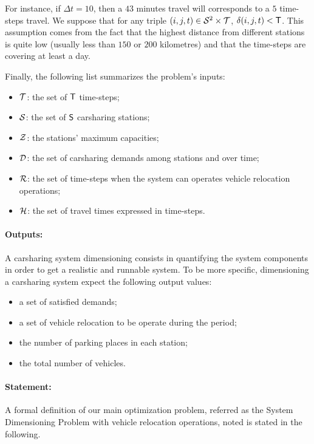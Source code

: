 \begin{bibunit}[ieeetr]
For instance, if $\Delta t = 10$, then a $43$ minutes travel will corresponds to a $5$ time-steps travel.
We suppose that for any triple $(i,j,t) \in \mathcal{S}^2 \times \mathcal{T}$, $\delta(i,j,t) < \mathsf{T}$.
This assumption comes from the fact that the highest distance from different stations is quite low (usually less than $150$ or $200$ kilometres) and that the time-steps are covering at least a day.
\medskip

Finally, the following list summarizes the problem's inputs:
\begin{itemize}
\item $\mathcal{T}$: the set of $\mathsf{T}$ time-steps;
\item $\mathcal{S}$: the set of $\mathsf{S}$ carsharing stations;
\item $\mathcal{Z}$: the stations' maximum capacities;
\item $\mathcal{D}$: the set of carsharing demands among stations and over time;
\item $\mathcal{R}$: the set of time-steps when the system can operates vehicle relocation operations;
\item $\mathcal{H}$: the set of travel times expressed in time-steps.
\end{itemize}

\paragraph{Outputs:}
A carsharing system dimensioning consists in quantifying the system components in order to get a realistic and runnable system.
To be more specific, dimensioning a carsharing system expect the following output values:
\begin{itemize}
\item a set of satisfied demands;
\item a set of vehicle relocation to be operate during the period;
\item the number of parking places in each station;
\item the total number of vehicles.
\end{itemize}

\paragraph{Statement:}
A formal definition of our main optimization problem, referred as the System Dimensioning Problem with vehicle relocation operations, noted {\SDP} is stated in the following.


\end{bibunit}
